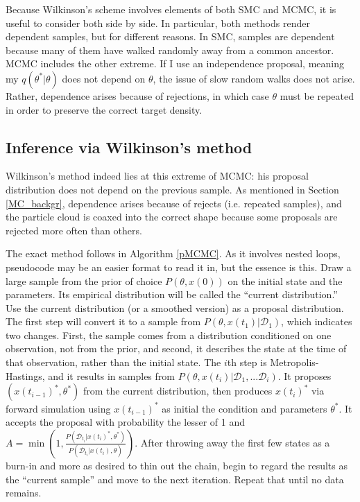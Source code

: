 \documentclass{article}
\begin{document}
Because Wilkinson's scheme involves elements of both SMC and MCMC, it is useful to consider both side by side. In particular, both methods render dependent samples, but for different reasons. In SMC, samples are dependent because many of them have walked randomly away from a common ancestor. MCMC includes the other extreme. If I use an independence proposal, meaning my $q(\theta^*|\theta)$ does not depend on $\theta$, the issue of slow random walks does not arise. Rather, dependence arises because of rejections, in which case $\theta$ must be repeated in order to preserve the correct target density.

\subsection{Inference via Wilkinson's method}
Wilkinson's method indeed lies at this extreme of MCMC: his proposal distribution does not depend on the previous sample. As mentioned in Section \ref{MC_backgr}, dependence arises because of rejects (i.e. repeated samples), and the particle cloud is coaxed into the correct shape because some proposals are rejected more often than others. 

The exact method follows in Algorithm \ref{pMCMC}. As it involves nested loops, pseudocode may be an easier format to read it in, but the essence is this. Draw a large sample from the prior of choice $P(\theta, x(0))$ on the initial state and the parameters. Its empirical distribution will be called the ``current distribution.'' Use the current distribution (or a smoothed version) as a proposal distribution. The first step will convert it to a sample from $P(\theta, x(t_1)|\mathcal{D}_1)$, which indicates two changes. First, the sample comes from a distribution conditioned on one observation, not from the prior, and second, it describes the state at the time of that observation, rather than the initial state. The $i$th step is Metropolis-Hastings, and it results in samples from $P(\theta, x(t_i)|\mathcal{D}_{1}, ...\mathcal{D}_{i})$. It proposes $(x(t_{i-1})^*, \theta^*)$ from the current distribution, then produces $x(t_{i})^*$ via forward simulation using $x(t_{i-1})^*$ as initial the condition and parameters $\theta^*$. It accepts the proposal with probability the lesser of 1 and $A=\min(1, \frac{P(\mathcal{D}_{t_{i}}|x(t_{i})^*, \theta^*)}{P(\mathcal{D}_{t_{i}}|x(t_{i}), \theta)})$. After throwing away the first few states as a burn-in and more as desired to thin out the chain, begin to regard the results as the ``current sample'' and move to the next iteration. Repeat that until no data remains.
\end{document}

